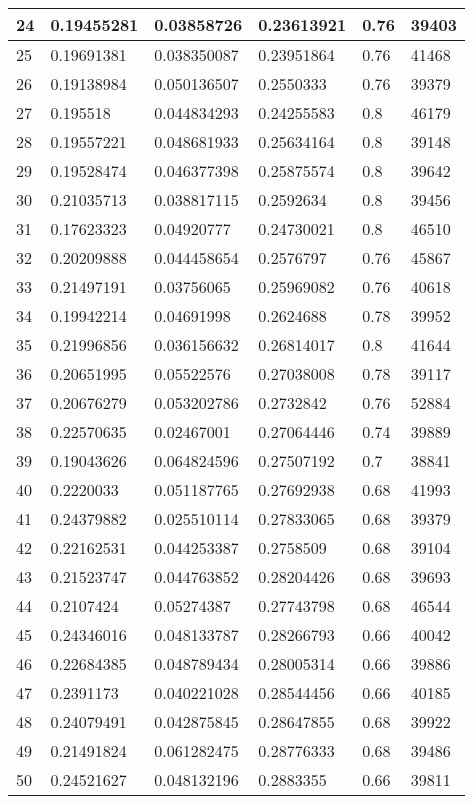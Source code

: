 \begin{longtable}{|l|l|l|l|l|l|}
24 & 0.19455281 & 0.03858726 & 0.23613921 & 0.76 & 39403 \\ \hline 
25 & 0.19691381 & 0.038350087 & 0.23951864 & 0.76 & 41468 \\ \hline 
26 & 0.19138984 & 0.050136507 & 0.2550333 & 0.76 & 39379 \\ \hline 
27 & 0.195518 & 0.044834293 & 0.24255583 & 0.8 & 46179 \\ \hline 
28 & 0.19557221 & 0.048681933 & 0.25634164 & 0.8 & 39148 \\ \hline 
29 & 0.19528474 & 0.046377398 & 0.25875574 & 0.8 & 39642 \\ \hline 
30 & 0.21035713 & 0.038817115 & 0.2592634 & 0.8 & 39456 \\ \hline 
31 & 0.17623323 & 0.04920777 & 0.24730021 & 0.8 & 46510 \\ \hline 
32 & 0.20209888 & 0.044458654 & 0.2576797 & 0.76 & 45867 \\ \hline 
33 & 0.21497191 & 0.03756065 & 0.25969082 & 0.76 & 40618 \\ \hline 
34 & 0.19942214 & 0.04691998 & 0.2624688 & 0.78 & 39952 \\ \hline 
35 & 0.21996856 & 0.036156632 & 0.26814017 & 0.8 & 41644 \\ \hline 
36 & 0.20651995 & 0.05522576 & 0.27038008 & 0.78 & 39117 \\ \hline 
37 & 0.20676279 & 0.053202786 & 0.2732842 & 0.76 & 52884 \\ \hline 
38 & 0.22570635 & 0.02467001 & 0.27064446 & 0.74 & 39889 \\ \hline 
39 & 0.19043626 & 0.064824596 & 0.27507192 & 0.7 & 38841 \\ \hline 
40 & 0.2220033 & 0.051187765 & 0.27692938 & 0.68 & 41993 \\ \hline 
41 & 0.24379882 & 0.025510114 & 0.27833065 & 0.68 & 39379 \\ \hline 
42 & 0.22162531 & 0.044253387 & 0.2758509 & 0.68 & 39104 \\ \hline 
43 & 0.21523747 & 0.044763852 & 0.28204426 & 0.68 & 39693 \\ \hline 
44 & 0.2107424 & 0.05274387 & 0.27743798 & 0.68 & 46544 \\ \hline 
45 & 0.24346016 & 0.048133787 & 0.28266793 & 0.66 & 40042 \\ \hline 
46 & 0.22684385 & 0.048789434 & 0.28005314 & 0.66 & 39886 \\ \hline 
47 & 0.2391173 & 0.040221028 & 0.28544456 & 0.66 & 40185 \\ \hline 
48 & 0.24079491 & 0.042875845 & 0.28647855 & 0.68 & 39922 \\ \hline 
49 & 0.21491824 & 0.061282475 & 0.28776333 & 0.68 & 39486 \\ \hline 
50 & 0.24521627 & 0.048132196 & 0.2883355 & 0.66 & 39811 \\ \hline 
\end{longtable}